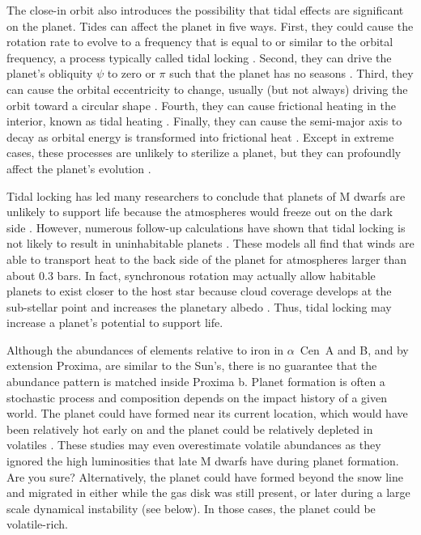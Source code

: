 \documentclass[preprint,12pt]{aastex}
\newcommand{\xxx}[1]{{\color{red} #1}} %
\newcommand{\xxx}[1]{{\color{red} #1}} %
\def\acen{{$\alpha$~Cen}}
\begin{document}
The close-in orbit also introduces the possibility that tidal effects
are significant on the planet. Tides can affect the planet in five
ways. First, they could cause the rotation rate to evolve to a
frequency that is equal to or similar to the orbital frequency, a
process typically called tidal locking
\citep{Dole64,Kasting93,Barnes16}. Second, they can drive the planet's
obliquity $\psi$ to zero or $\pi$ such that the planet has no seasons
\citep{Heller11}. Third, they can cause the orbital eccentricity to
change, usually (but not always) driving the orbit toward a circular
shape \citep{Darwin1880}. Fourth, they can cause frictional heating in
the interior, known as tidal heating
\citep{Peale79,Jackson08c,Barnes13}. Finally, they can cause the
semi-major axis to decay as orbital energy is transformed into
frictional heat \citep{Darwin1880,Barnes08}. Except in extreme cases,
these processes are unlikely to sterilize a planet, but they can
profoundly affect the planet's evolution \xxx{\citep{DriscollBarnes15}}.

Tidal locking has led many researchers to conclude that planets of M
dwarfs are unlikely to support life because the atmospheres would
freeze out on the dark side \citep{Kasting93}. However, numerous
follow-up calculations have shown that tidal locking is not likely to
result in uninhabitable planets
\citep{Joshi97,Pierrehumbert11,Wordsworth11,Yang13,Shields16}. These
models all find that winds are able to transport heat to the back side
of the planet for atmospheres larger than about 0.3 bars. In fact,
synchronous rotation may actually allow habitable planets to exist
closer to the host star because cloud coverage develops at the
sub-stellar point and increases the planetary albedo
\citep{Yang13}. Thus, tidal locking may increase a planet's potential
to support life.

Although the abundances of elements relative to iron in \acen~A and B,
and by extension Proxima, are similar to the Sun's, there is no
guarantee that the abundance pattern is matched inside Proxima
b. Planet formation is often a stochastic process and composition
depends on the impact history of a given world. The planet could have
formed near its current location, which would have been relatively hot
early on and the planet could be relatively depleted in volatiles
\citep{Raymond07,Mulders15}. These studies may even overestimate
volatile abundances as they ignored the high luminosities that late M
dwarfs have during planet formation. \xxx{Are you sure?} Alternatively, the planet could
have formed beyond the snow line and migrated in either while the gas
disk was still present, or later during a large scale dynamical
instability (see below). In those cases, the planet could be
volatile-rich.
\end{document}

